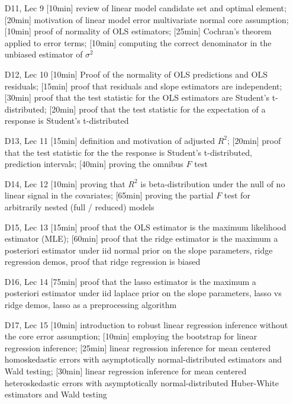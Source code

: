\begin{enumerate}
\item[D11, Lec 9] [10min] review of linear model candidate set and optimal element; [20min] motivation of linear model error multivariate normal core assumption; [10min] proof of normality of OLS estimators; [25min] Cochran's theorem applied to error terms; [10min] computing the correct denominator in the unbiased estimator of $\sigma^2$

\item[D12, Lec 10] [10min] Proof of the normality of OLS predictions and OLS residuals; [15min] proof that residuals and slope estimators are independent; [30min] proof that the test statistic for the OLS estimators are Student's t-distributed; [20min] proof that the test statistic for the expectation of a response is Student's t-distributed

\item[D13, Lec 11] [15min] definition and motivation of adjusted $R^2$; [20min] proof that the test statistic for the the response is Student's t-distributed, prediction intervals; [40min] proving the omnibus $F$ test

\item[D14, Lec 12] [10min] proving that $R^2$ is beta-distribution under the null of no linear signal in the covariates; [65min] proving the partial $F$ test for arbitrarily nested (full / reduced) models

\item[D15, Lec 13] [15min] proof that the OLS estimator is the maximum likelihood estimator (MLE); [60min] proof that the ridge estimator is the maximum a posteriori estimator under iid normal prior on the slope parameters, ridge regression demos, proof that ridge regression is biased

\item[D16, Lec 14] [75min] proof that the lasso estimator is the maximum a posteriori estimator under iid laplace prior on the slope parameters, lasso vs ridge demos, lasso as a  preprocessing algorithm

\item[D17, Lec 15] [10min] introduction to robust linear regression inference without the core error assumption; [10min] employing the bootstrap for linear regression inference; [25min] linear regression inference for mean centered homoskedastic errors with asymptotically normal-distributed estimators and Wald testing; [30min] linear regression inference for mean centered heteroskedastic errors with asymptotically normal-distributed Huber-White estimators and Wald testing


\end{enumerate}
